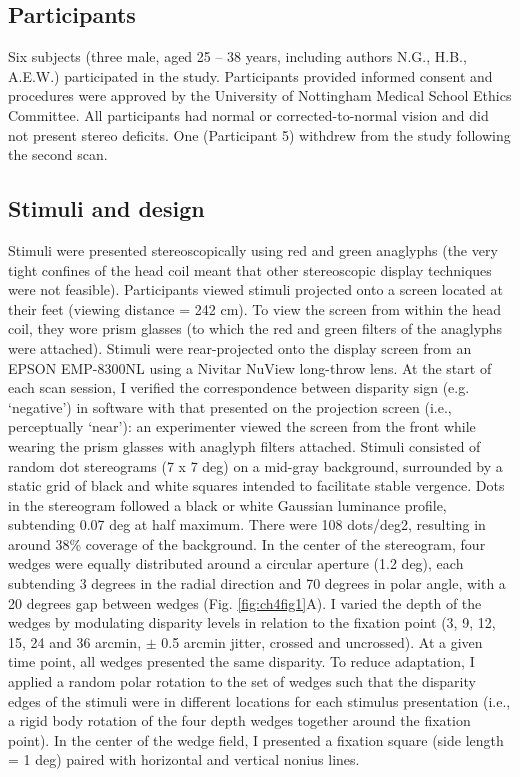 \subsection{Participants}

Six subjects (three male, aged 25 -- 38 years, including authors N.G., H.B., A.E.W.) participated in the study. Participants provided informed consent and procedures were approved by the University of Nottingham Medical School Ethics Committee. All participants had normal or corrected-to-normal vision and did not present stereo deficits. One (Participant 5) withdrew from the study following the second scan.

\subsection{Stimuli and design}
Stimuli were presented stereoscopically using red and green anaglyphs (the very tight confines of the head coil meant that other stereoscopic display techniques were not feasible). Participants viewed stimuli projected onto a screen located at their feet (viewing distance = 242 cm). To view the screen from within the head coil, they wore prism glasses (to which the red and green filters of the anaglyphs were attached). Stimuli were rear-projected onto the display screen from an EPSON EMP-8300NL using a Nivitar NuView long-throw lens. At the start of each scan session, I verified the correspondence between disparity sign (e.g. `negative') in software with that presented on the projection screen (i.e., perceptually `near'): an experimenter viewed the screen from the front while wearing the prism glasses with anaglyph filters attached.
Stimuli consisted of random dot stereograms (7 x 7 deg) on a mid-gray background, surrounded by a static grid of black and white squares intended to facilitate stable vergence. Dots in the stereogram followed a black or white Gaussian luminance profile, subtending 0.07 deg at half maximum. There were 108 dots/deg2, resulting in around 38\% coverage of the background. In the center of the stereogram, four wedges were equally distributed around a circular aperture (1.2 deg), each subtending 3 degrees in the radial direction and 70 degrees in polar angle, with a 20 degrees gap between wedges (Fig. \ref{fig:ch4fig1}A). I varied the depth of the wedges by modulating disparity levels in relation to the fixation point (3, 9, 12, 15, 24 and 36 arcmin, $\pm$ 0.5 arcmin jitter, crossed and uncrossed). At a given time point, all wedges presented the same disparity. To reduce adaptation, I applied a random polar rotation to the set of wedges such that the disparity edges of the stimuli were in different locations for each stimulus presentation (i.e., a rigid body rotation of the four depth wedges together around the fixation point). In the center of the wedge field, I presented a fixation square (side length = 1 deg) paired with horizontal and vertical nonius lines.
